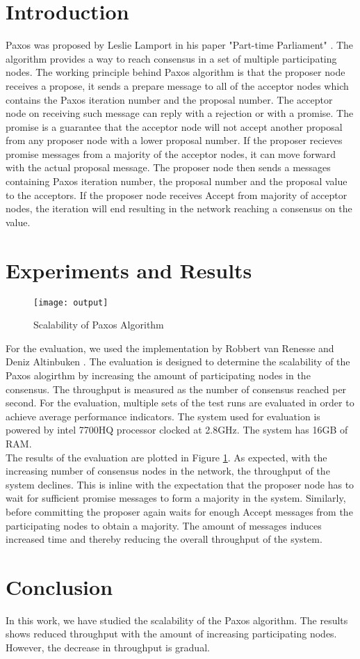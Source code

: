 \section{Introduction}
Paxos was proposed by Leslie Lamport in his paper "Part-time Parliament" \cite{lamport1998part}. 
The algorithm provides a way to reach consensus in a set of multiple participating nodes. 
The working principle behind Paxos algorithm is that the proposer node receives a propose, it sends a prepare message to all of the acceptor nodes which contains the Paxos iteration number and the proposal number. 
The acceptor node on receiving such message can reply with a rejection or with a promise. 
The promise is a guarantee that the acceptor node will not accept another proposal from any proposer node with a lower proposal number. 
If the proposer recieves promise messages from a majority of the acceptor nodes, it can move forward with the actual proposal message. 
The proposer node then sends a messages containing Paxos iteration number, the proposal number and the proposal value to the acceptors. 
If the proposer node receives Accept from majority of acceptor nodes, the iteration will end resulting in the network reaching a consensus on the value. 
\section{Experiments and Results}
\begin{figure}
\centering
\vspace*{-3cm}
\texttt{[image: output]} 
\label{fig:paxos}
\vspace*{-3.5cm}
\caption{Scalability of Paxos Algorithm}
\end{figure}
For the evaluation, we used the implementation by Robbert van Renesse and Deniz Altinbuken \cite{van2015paxos}. 
The evaluation is designed to determine the scalability of the Paxos alogirthm by increasing the amount of participating nodes in the consensus. 
The throughput is measured as the number of consensus reached per second. 
For the evaluation, multiple sets of the test runs are evaluated in order to achieve average performance indicators. 
The system used for evaluation is powered by intel 7700HQ processor clocked at 2.8GHz. 
The system has 16GB of RAM. \\
The results of the evaluation are plotted in Figure \ref{fig:paxos}. 
As expected, with the increasing number of consensus nodes in the network, the throughput of the system declines. 
This is inline with the expectation that the proposer node has to wait for sufficient promise messages to form a majority in the system. 
Similarly, before committing the proposer again waits for enough Accept messages from the participating nodes to obtain a majority. 
The amount of messages induces increased time and thereby reducing the overall throughput of the system. 
\section{Conclusion}
In this work, we have studied the scalability of the Paxos algorithm. The results shows reduced throughput with the amount of increasing participating nodes. However, the decrease in throughput is gradual. 

